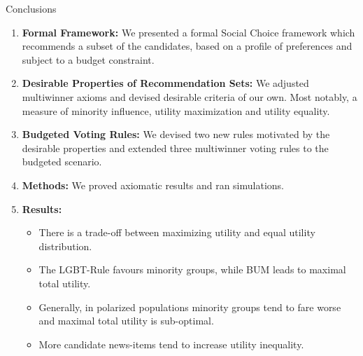\documentclass{beamer}
\begin{document}
\begin{frame}{Conclusions}

\begin{enumerate}
	\item \textbf{Formal Framework:} We presented a formal Social Choice framework which recommends a subset of the candidates, based on a profile of preferences and subject to a budget constraint.
	\item \textbf{Desirable Properties of Recommendation Sets:} We adjusted multiwinner axioms and devised desirable criteria of our own. Most notably, a measure of minority influence, utility maximization and utility equality.
	\item \textbf{Budgeted Voting Rules:} We devised two new rules motivated by the desirable properties and extended three multiwinner voting rules to the budgeted scenario.
	\item \textbf{Methods:} We proved axiomatic results and ran simulations.
	\item \textbf{Results:}
\begin{itemize}
\item There is a trade-off between maximizing utility and equal utility distribution.
\item The LGBT-Rule favours minority groups, while BUM leads to maximal total utility.
\item Generally, in polarized populations minority groups tend to fare worse and maximal total utility is sub-optimal.
\item More candidate news-items tend to increase utility inequality.
\end{itemize}
\end{enumerate}

\end{frame}

%
%


%
\end{document}
